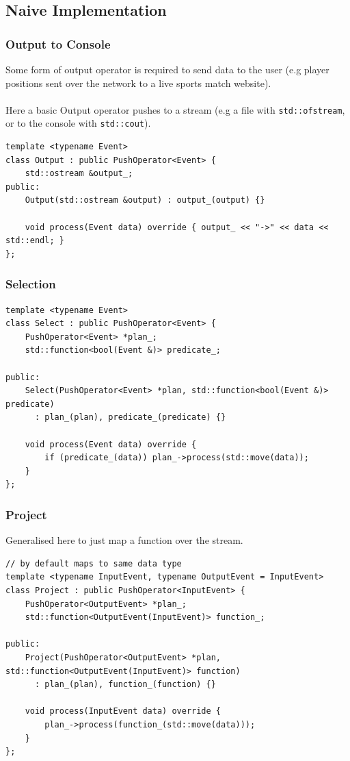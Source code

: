 \subsection{Naive Implementation}
\subsubsection{Output to Console}
Some form of output operator is required to send data to the user (e.g player positions sent over the network to a live sports match website).
\\
\\ Here a basic Output operator pushes to a stream (e.g a file with \texttt{std::ofstream}, or to the console with \texttt{std::cout}).
\begin{verbatim}
template <typename Event>
class Output : public PushOperator<Event> {
    std::ostream &output_;
public:
    Output(std::ostream &output) : output_(output) {}

    void process(Event data) override { output_ << "->" << data << std::endl; }
};
\end{verbatim}

\subsubsection{Selection}
\begin{verbatim}
template <typename Event>
class Select : public PushOperator<Event> {
    PushOperator<Event> *plan_;
    std::function<bool(Event &)> predicate_;

public:
    Select(PushOperator<Event> *plan, std::function<bool(Event &)> predicate) 
      : plan_(plan), predicate_(predicate) {}

    void process(Event data) override {
        if (predicate_(data)) plan_->process(std::move(data));
    }
};
\end{verbatim}

\subsubsection{Project}
Generalised here to just map a function over the stream.
\begin{verbatim}
// by default maps to same data type
template <typename InputEvent, typename OutputEvent = InputEvent>
class Project : public PushOperator<InputEvent> {
    PushOperator<OutputEvent> *plan_;
    std::function<OutputEvent(InputEvent)> function_;

public:
    Project(PushOperator<OutputEvent> *plan, std::function<OutputEvent(InputEvent)> function) 
      : plan_(plan), function_(function) {}

    void process(InputEvent data) override {
        plan_->process(function_(std::move(data)));
    }
};
\end{verbatim}

